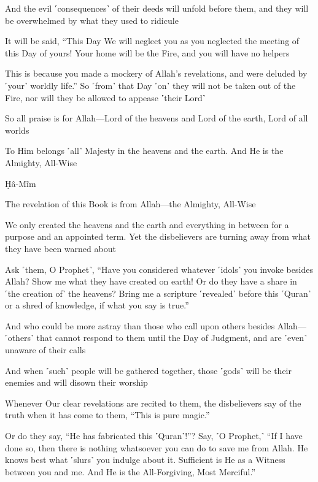 And the evil ˹consequences˺ of their deeds will unfold before them, and they will be overwhelmed by what they used to ridicule

It will be said, “This Day We will neglect you as you neglected the meeting of this Day of yours! Your home will be the Fire, and you will have no helpers

This is because you made a mockery of Allah’s revelations, and were deluded by ˹your˺ worldly life.” So ˹from˺ that Day ˹on˺ they will not be taken out of the Fire, nor will they be allowed to appease ˹their Lord˺

So all praise is for Allah—Lord of the heavens and Lord of the earth, Lord of all worlds

To Him belongs ˹all˺ Majesty in the heavens and the earth. And He is the Almighty, All-Wise

Ḥâ-Mĩm

The revelation of this Book is from Allah—the Almighty, All-Wise

We only created the heavens and the earth and everything in between for a purpose and an appointed term. Yet the disbelievers are turning away from what they have been warned about

Ask ˹them, O Prophet˺, “Have you considered whatever ˹idols˺ you invoke besides Allah? Show me what they have created on earth! Or do they have a share in ˹the creation of˺ the heavens? Bring me a scripture ˹revealed˺ before this ˹Quran˺ or a shred of knowledge, if what you say is true.”

And who could be more astray than those who call upon others besides Allah—˹others˺ that cannot respond to them until the Day of Judgment, and are ˹even˺ unaware of their calls

And when ˹such˺ people will be gathered together, those ˹gods˺ will be their enemies and will disown their worship

Whenever Our clear revelations are recited to them, the disbelievers say of the truth when it has come to them, “This is pure magic.”

Or do they say, “He has fabricated this ˹Quran˺!”? Say, ˹O Prophet,˺ “If I have done so, then there is nothing whatsoever you can do to save me from Allah. He knows best what ˹slurs˺ you indulge about it. Sufficient is He as a Witness between you and me. And He is the All-Forgiving, Most Merciful.”

